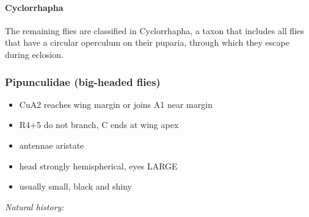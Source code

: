 \documentclass[letterpaper, 11pt]{article}
\begin{document}
\paragraph{Cyclorrhapha} The remaining flies are classified in Cyclorrhapha, a taxon that includes all flies that have a circular operculum on their puparia, through which they escape during eclosion.

\subsubsection{Pipunculidae (big-headed flies)}
\begin{itemize}
\item CuA2 reaches wing margin or joins A1 near margin
\item R4+5 do not branch, C ends at wing apex
\item antennae aristate
\item head strongly hemispherical, eyes LARGE
\item usually small, black and shiny
\end{itemize}

\noindent{}\textit{Natural history:} \\
\end{document}
